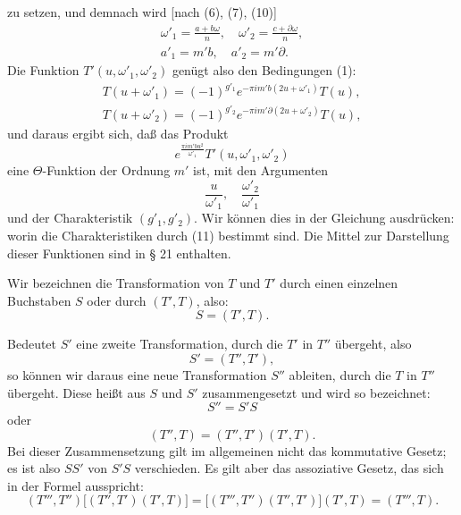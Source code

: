 zu setzen, und demnach wird [nach (6), (7), (10)]
\[
\begin{gathered}
\omega'_1 = \frac{a+b\omega}{n}, \quad \omega'_2 = \frac{c+\partial\omega}{n}, \\
a'_1 = m'b, \quad a'_2 = m'\partial.
\end{gathered}
\]
Die Funktion $T'(u, \omega'_1, \omega'_2)$ genügt also den Bedingungen (1):
\[
\begin{gathered}
T(u+\omega'_1) = (-1)^{g'_1} e^{-\pi i m'b(2u+\omega'_1)} T(u), \\
T(u+\omega'_2) = (-1)^{g'_2} e^{-\pi i m'\partial(2u+\omega'_2)} T(u),
\end{gathered}
\]
und daraus ergibt sich, daß das Produkt
\[
e^{\frac{\pi i m'bu^2}{\omega'_1}} T'(u, \omega'_1, \omega'_2)
\]
eine $\Theta$-Funktion der Ordnung $m'$ ist, mit den Argumenten
\[
\frac{u}{\omega'_1}, \quad \frac{\omega'_2}{\omega'_1}
\]
und der Charakteristik $(g'_1, g'_2)$. Wir können dies in der
Gleichung ausdrücken:
worin die Charakteristiken durch (11) bestimmt sind. Die Mittel
zur Darstellung dieser Funktionen sind in § 21 enthalten.

Wir bezeichnen die Transformation von $T$ und $T'$ durch
einen einzelnen Buchstaben $S$ oder durch $(T', T)$, also:
\[
S = (T', T).
\]

Bedeutet $S'$ eine zweite Transformation, durch die $T'$ in $T''$
übergeht, also
\[
S' = (T'', T'),
\]
so können wir daraus eine neue Transformation $S''$ ableiten,
durch die $T$ in $T''$ übergeht. Diese heißt aus $S$ und $S'$ zusammengesetzt
und wird so bezeichnet:
\[
S'' = S'S
\]
oder
\[
(T'', T) = (T'', T')(T', T).
\]
Bei dieser Zusammensetzung gilt im allgemeinen nicht das
kommutative Gesetz; es ist also $SS'$ von $S'S$ verschieden. Es
gilt aber das assoziative Gesetz, das sich in der Formel ausspricht:
\[
(T''', T'')\big[(T'', T')(T', T)\big] = \big[(T''', T'')(T'', T')\big](T', T) = (T''', T).
\]
